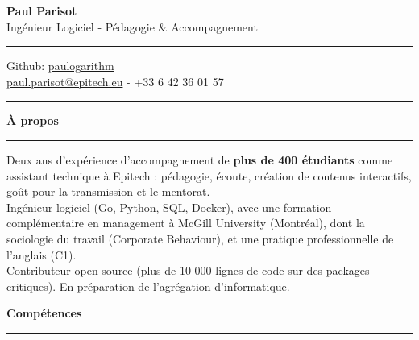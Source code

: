 \documentclass[9pt]{extarticle}
\begin{document}
\begin{center}
	{\huge\bfseries Paul Parisot}
	\\[4pt]
	{\Large Ingénieur Logiciel - Pédagogie \& Accompagnement}
	\\
\end{center}


\par\vspace{-5pt}
\rule{\linewidth}{0.4pt}
\par\vspace{-5pt}

\begin{center}
	Github: \href{https://github.com/paulogarithm}{paulogarithm}
	\\
	\href{mailto:paul.parisot@epitech.eu}{paul.parisot@epitech.eu} - +33 6 42 36 01 57
	\\
\end{center}

\par\vspace{-10pt}
\rule{\linewidth}{0.4pt}
\par\vspace{7pt}


{\large\bfseries À propos}
\par\vspace{-8pt}
\rule{\linewidth}{0.4pt}
\par\vspace{5pt}

Deux ans d'expérience d'accompagnement de {\bfseries plus de 400 étudiants} comme assistant technique à Epitech : pédagogie, écoute, création de contenus interactifs, goût pour la transmission et le mentorat.
\\
Ingénieur logiciel (Go, Python, SQL, Docker), avec une formation complémentaire en management à McGill University (Montréal), dont la sociologie du travail (Corporate Behaviour), et une pratique professionnelle de l'anglais (C1).
\\
Contributeur open-source (plus de 10 000 lignes de code sur des packages critiques). En préparation de l'agrégation d'informatique.
\par\vspace{5pt}


{\large\bfseries Compétences}
\par\vspace{-8pt}
\rule{\linewidth}{0.4pt}
\par\vspace{5pt}
\end{document}

